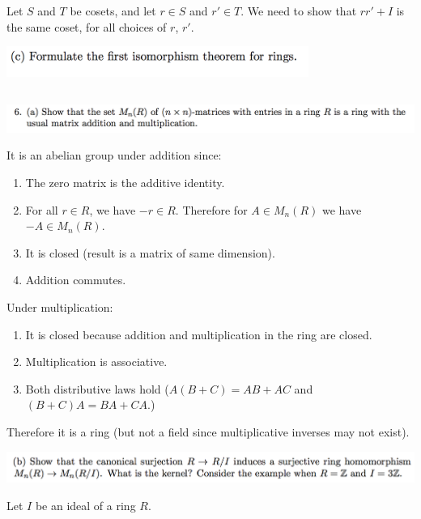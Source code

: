 \documentclass[12pt]{article}
\begin{document}
Let $S$ and $T$ be cosets, and let $r \in S$ and $r' \in T$. We need to show that $rr' + I$ is the
same coset, for all choices of $r$, $r'$.

\newpage
\begin{mdframed}
\includegraphics[width=280pt]{img/linear-algebra-a0-1-5-c.png}\\
\end{mdframed}

\newpage
\subsection*{} %
\begin{mdframed}
\includegraphics[width=400pt]{img/linear-algebra-a0-1-6-a.png}\\
\end{mdframed}
It is an abelian group under addition since:
\begin{enumerate}
\item The zero matrix is the additive identity.
\item For all $r \in R$, we have $-r \in R$. Therefore for $A \in M_n(R)$ we have $-A \in M_n(R)$.
\item It is closed (result is a matrix of same dimension).
\item Addition commutes.
\end{enumerate}

Under multiplication:
\begin{enumerate}
\item It is closed because addition and multiplication in the ring are closed.
\item Multiplication is associative.
\item Both distributive laws hold ($A(B + C) = AB + AC$ and $(B + C)A = BA + CA$.)
\end{enumerate}

Therefore it is a ring (but not a field since multiplicative inverses may not exist).

\begin{mdframed}
\includegraphics[width=400pt]{img/linear-algebra-a0-1-6-b.png}\\
\end{mdframed}
Let $I$ be an ideal of a ring $R$.
\end{document}
